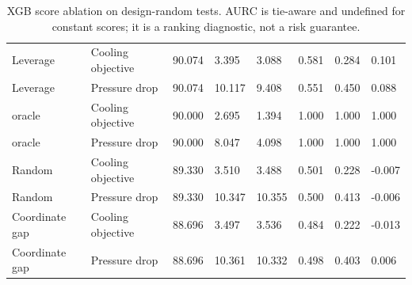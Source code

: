 \begin{table}[htbp]
\begin{tabular}{llllllll}
Leverage & Cooling objective & 90.074 & 3.395 & 3.088 & 0.581 & 0.284 & 0.101\\
Leverage & Pressure drop & 90.074 & 10.117 & 9.408 & 0.551 & 0.450 & 0.088\\
oracle & Cooling objective & 90.000 & 2.695 & 1.394 & 1.000 & 1.000 & 1.000\\
oracle & Pressure drop & 90.000 & 8.047 & 4.098 & 1.000 & 1.000 & 1.000\\
Random & Cooling objective & 89.330 & 3.510 & 3.488 & 0.501 & 0.228 & -0.007\\
Random & Pressure drop & 89.330 & 10.347 & 10.355 & 0.500 & 0.413 & -0.006\\
Coordinate gap & Cooling objective & 88.696 & 3.497 & 3.536 & 0.484 & 0.222 & -0.013\\
Coordinate gap & Pressure drop & 88.696 & 10.361 & 10.332 & 0.498 & 0.403 & 0.006\\
\bottomrule\end{tabular}\caption{XGB score ablation on design-random tests. AURC is tie-aware and undefined for constant scores; it is a ranking diagnostic, not a risk guarantee.}\label{tab:ubend-ablation}\end{table}
